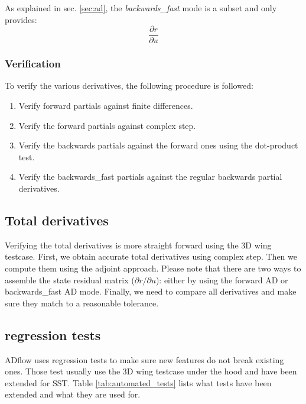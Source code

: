 As explained in sec. \ref{sec:ad}, the \textit{backwards\_fast} mode is a
subset and only provides:
\begin{equation}
    \frac{\partial r}{\partial u}
\end{equation}


\subsubsection{Verification}
To verify the various derivatives, the following procedure is followed:

\begin{enumerate}
    \item Verify forward partials against finite differences.

    \item Verify the forward partials against complex step.

    \item Verify the backwards partials against the forward ones using the
        dot-product test.

    \item Verify the backwards\_fast partials against the regular backwards
        partial derivatives.
\end{enumerate}




\subsection{Total derivatives}
\label{subsec:total_derivs}
Verifying the total derivatives is more straight forward using the 3D wing
testcase. First, we obtain accurate total derivatives using complex step. Then
we compute them using the adjoint approach. Please note that there are two ways
to assemble the state residual matrix ($\partial r / \partial u$): either by
using the forward AD or backwards\_fast AD mode. Finally, we need to compare
all derivatives and make sure they match to a reasonable tolerance.




\subsection{regression tests}
\noindent ADflow uses regression tests to make sure new features do not break
existing ones. Those test usually use the 3D wing testcase under the hood and
have been extended for SST. Table \ref{tab:automated_tests} lists what tests
have been extended and what they are used for.

